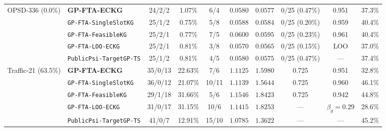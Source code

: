 \begin{table}[htbp]
{\begin{tabular}{llcccccccc}
\midrule
\multirow{5}{*}{OPSD-336 (0.0\%)} & \textbf{GP-FTA-ECKG} & 24/2/2 & 1.07\% & 6/4 & $0.0580$ & $0.0577$ & 0/25 (0.47\%) & 0.951 & 37.3\% \\
 & \texttt{GP-FTA-SingleSlotKG} & 25/1/2 & 0.75\% & 5/8 & $0.0588$ & $0.0584$ & 0/25 (0.20\%) & 0.959 & 40.4\% \\
 & \texttt{GP-FTA-FeasibleKG} & 25/2/1 & 0.77\% & 7/5 & $0.0600$ & $0.0595$ & 0/25 (0.23\%) & 0.961 & 40.4\% \\
 & \texttt{GP-FTA-LOO-ECKG} & 25/2/1 & 0.81\% & 3/8 & $0.0570$ & $0.0565$ & 0/25 (0.15\%) & LOO & 37.0\% \\
 & \texttt{PublicPsi-TargetGP-TS} & 25/1/2 & 0.81\% & 4/5 & $0.0580$ & $0.0575$ & 0/25 (0.47\%) & --- & 37.4\% \\
\midrule
\multirow{5}{*}{Traffic-21 (63.5\%)} & \textbf{GP-FTA-ECKG} & 35/0/13 & 22.63\% & 7/6 & $1.1125$ & $1.5980$ & 0.725 & 0.951 & 32.8\% \\
 & \texttt{GP-FTA-SingleSlotKG} & 36/0/12 & 21.07\% & 10/11 & $1.1139$ & $1.5644$ & 0.725 & 0.960 & 46.1\% \\
 & \texttt{GP-FTA-FeasibleKG} & 29/1/18 & 31.66\% & 5/6 & $1.1546$ & $1.8423$ & 0.725 & 0.942 & 44.8\% \\
 & \texttt{GP-FTA-LOO-ECKG} & 31/0/17 & 31.15\% & 10/6 & $1.1415$ & $1.8253$ & --- & $\beta_g=0.29$ & 28.6\% \\
 & \texttt{PublicPsi-TargetGP-TS} & 41/0/7 & 12.91\% & 15/10 & $1.0785$ & $1.3622$ & --- & --- & 45.2\% \\
\bottomrule
\end{tabular}%
}
\end{table}
